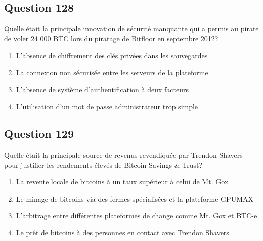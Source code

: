 \documentclass[12pt,a4paper]{article}
\begin{document}

\bigskip


\subsection*{Question 128}
Quelle était la principale innovation de sécurité manquante qui a permis au pirate de voler 24 000 BTC lors du piratage de Bitfloor en septembre 2012?

\begin{enumerate}[label=\Alph*., leftmargin=*]
\item L'absence de chiffrement des clés privées dans les sauvegardes
\item La connexion non sécurisée entre les serveurs de la plateforme
\item L'absence de système d'authentification à deux facteurs
\item L'utilisation d'un mot de passe administrateur trop simple
\end{enumerate}

\bigskip


\subsection*{Question 129}
Quelle était la principale source de revenus revendiquée par Trendon Shavers pour justifier les rendements élevés de Bitcoin Savings & Trust?

\begin{enumerate}[label=\Alph*., leftmargin=*]
\item La revente locale de bitcoins à un taux supérieur à celui de Mt. Gox
\item Le minage de bitcoins via des fermes spécialisées et la plateforme GPUMAX
\item L'arbitrage entre différentes plateformes de change comme Mt. Gox et BTC-e
\item Le prêt de bitcoins à des personnes en contact avec Trendon Shavers
\end{enumerate}
\end{document}
